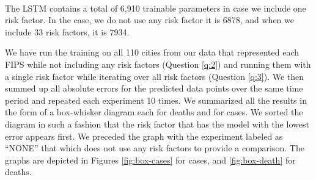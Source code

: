 \documentclass[letterpaper, inpress]{jds} %
\renewcommand{\_}{%
    \textunderscore\hspace{0pt}%
}
\begin{document}
\begin{table}[!h]
    \caption{The deep learning parameters used for the model sweep
      creation in as exported by Keras using 1 risk factor. The
      activation function is RELU and the recurrent activation
      function is sigmoid.}
    \label{tab:model}
    \bigskip

    \settowidth{\rotheadsize}{Parameters\quad}

    \begin{footnotesize}
    \centering
     ~\\
    The LSTM contains a total of 6,910 trainable parameters in
    case we include one risk factor. In the case, we do not use any
    risk factor it is 6878, and when we include 33 risk factors, it is
    7934.
    \end{footnotesize}
\end{table}



We have run the training on all 110 cities from our data that
represented each FIPS while not including any risk factors (Question
\ref{q:2}) and running them with a single risk factor while iterating
over all risk factors (Question \ref{q:3}). We then summed up all
absolute errors for the predicted data points over the same time
period and repeated each experiment 10 times. We summarized all the
results in the form of a box-whisker diagram each for deaths and for
cases. We sorted the diagram in such a fashion that the risk factor
that has the model with the lowest error appears first. We preceded
the graph with the experiment labeled as ``NONE'' that which does not
use any risk factors to provide a comparison. The graphs are depicted
in Figures \ref{fig:box-cases} for cases, and \ref{fig:box-death} for
deaths.
\end{document}
